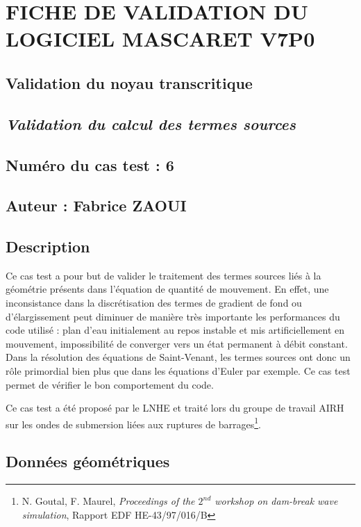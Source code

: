 \documentclass[a4paper,10pt]{article}
\begin{document}
\section*{FICHE DE VALIDATION DU LOGICIEL MASCARET V7P0}

\subsection*{Validation du noyau transcritique}

\subsection*{\emph{Validation du calcul des termes sources}}

\subsection*{Numéro du cas test : 6}

\subsection*{Auteur : Fabrice ZAOUI}


\vspace{1cm}

\subsection*{Description}

Ce cas test a pour but de valider le traitement des termes sources liés à la géométrie présents dans l’équation de quantité de mouvement.
En effet, une inconsistance dans la discrétisation des termes de gradient de fond ou d'élargissement peut diminuer de manière très importante les performances
du code utilisé : plan d'eau initialement au repos instable et mis artificiellement en mouvement, impossibilité de converger vers un état permanent à débit constant.
Dans la résolution des équations de Saint-Venant, les termes sources ont donc un rôle primordial bien plus que dans les équations d'Euler par exemple. Ce cas test permet
de vérifier le bon comportement du code.

Ce cas test a été proposé par le LNHE et traité lors du groupe de travail AIRH sur les ondes de submersion liées aux ruptures de barrages\footnote{N. Goutal, F. Maurel, \emph{Proceedings of the $2^{nd}$ workshop on dam-break wave simulation}, Rapport EDF HE-43/97/016/B}.

\subsection*{Données géométriques}
\end{document}
